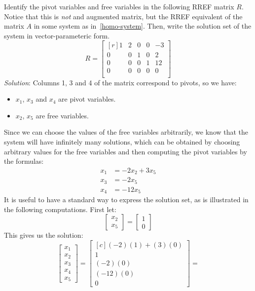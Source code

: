 \documentclass[12pt]{article}
\begin{document}
\begin{example}
\label{homo-example1}
 Identify the pivot variables and free variables in the following RREF matrix $R$. Notice that this is \emph{not} and augmented matrix, but the RREF equivalent of the matrix $A$ in some system as in~\ref{homo-system}. Then, write the solution set of the system in vector-parameteric form.
\[
R=\begin{bmatrix*}[r]
1 & 2 & 0 & 0 & -3 \\
0 & 0 & 1 & 0 &  2 \\
0 & 0 & 0 & 1 & 12 \\
0 & 0 & 0 & 0 &  0 \\
\end{bmatrix*}
\]
\emph{Solution}: Columns 1, 3 and 4 of the matrix correspond to pivots, so we have:
\begin{itemize}
\item $x_1$, $x_3$ and $x_4$ are pivot variables.
\item $x_2$, $x_5$ are free variables.
\end{itemize}
Since we can choose the values of the free variables arbitrarily, we know that the system will have infinitely many solutions, which can be obtained by choosing arbitrary values for the free variables and then computing the pivot variables by the formulas:
\begin{align*}
x_1&=-2x_2+3x_5\\
x_3&=-2x_5\\
x_4&=-12x_5
\end{align*}
It is useful to have a standard way to express the solution set, as is illustrated in the following computations.
First let:
\[
\begin{bmatrix}x_2\\x_5\end{bmatrix}=\begin{bmatrix}1\\0\end{bmatrix}
\]
This gives us the solution:
\[
\begin{bmatrix}x_1\\x_2\\x_3\\x_4\\x_5\end{bmatrix}=
\begin{bmatrix*}[c](-2)(1)+(3)(0)\\1\\(-2)(0)\\(-12)(0)\\0\end{bmatrix*}=
\]
\end{example}
\end{document}
